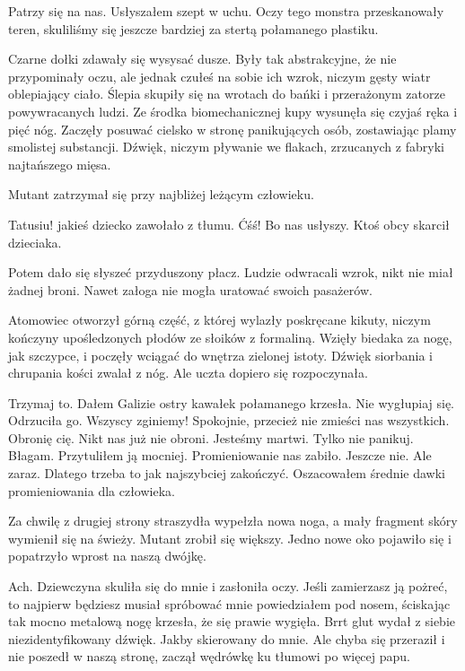 \begin{dialogue}
	\ds{} Patrzy się na nas. \dm{} Usłyszałem szept w uchu. Oczy tego monstra przeskanowały teren, skuliliśmy się jeszcze bardziej za stertą połamanego plastiku.
\end{dialogue}

Czarne dołki zdawały się wysysać dusze.
Były tak abstrakcyjne, że nie przypominały oczu, ale jednak czułeś na sobie ich wzrok, niczym gęsty wiatr oblepiający ciało.
Ślepia skupiły się na wrotach do bańki i przerażonym zatorze powywracanych ludzi.
Ze środka biomechanicznej kupy wysunęła się czyjaś ręka i pięć nóg.
Zaczęły posuwać cielsko w stronę panikujących osób, zostawiając plamy smolistej substancji.
Dźwięk, niczym pływanie we flakach, zrzucanych z fabryki najtańszego mięsa.

Mutant zatrzymał się przy najbliżej leżącym człowieku.
\begin{dialogue}
	\ds{} Tatusiu! \dm{} jakieś dziecko zawołało z tłumu.
	\ds{} Ćśś! Bo nas usłyszy. \dm{} Ktoś obcy skarcił dzieciaka.
\end{dialogue}

Potem dało się słyszeć przyduszony płacz.
Ludzie odwracali wzrok, nikt nie miał żadnej broni.
Nawet załoga nie mogła uratować swoich pasażerów.

Atomowiec otworzył górną część, z której wylazły poskręcane kikuty, niczym kończyny upośledzonych płodów ze słoików z formaliną.
Wzięły biedaka za nogę, jak szczypce, i poczęły wciągać do wnętrza zielonej istoty.
Dźwięk siorbania i chrupania kości zwalał z nóg.
Ale uczta dopiero się rozpoczynała.

\begin{dialogue}
	\ds{} Trzymaj to. \dm{} Dałem Galizie ostry kawałek połamanego krzesła.
	\ds{} Nie wygłupiaj się. \dm{} Odrzuciła go. \dm{} Wszyscy zginiemy!
	\ds{} Spokojnie, przecież nie zmieści nas wszystkich. Obronię cię.
	\ds{} Nikt nas już nie obroni. Jesteśmy martwi.
	\ds{} Tylko nie panikuj. Błagam. \dm{} Przytuliłem ją mocniej.
	\ds{} Promieniowanie nas zabiło.
	\ds{} Jeszcze nie. Ale zaraz. Dlatego trzeba to jak najszybciej zakończyć. \dm{} Oszacowałem średnie dawki promieniowania dla człowieka.
\end{dialogue}

Za chwilę z drugiej strony straszydła wypełzła nowa noga, a mały fragment skóry wymienił się na świeży.
Mutant zrobił się większy.
Jedno nowe oko pojawiło się i popatrzyło wprost na naszą dwójkę.
\begin{dialogue}
	\ds{} Ach. \dm{} Dziewczyna skuliła się do mnie i zasłoniła oczy.
	\ds{} Jeśli zamierzasz ją pożreć, to najpierw będziesz musiał spróbować mnie \dm{} powiedziałem pod nosem, ściskając tak mocno metalową nogę krzesła, że się prawie wygięła.
	\ds{} Brrt \dm{} glut wydał z siebie niezidentyfikowany dźwięk. Jakby skierowany do mnie. Ale chyba się przeraził i nie poszedł w naszą stronę, zaczął wędrówkę ku tłumowi po więcej papu.
\end{dialogue}

